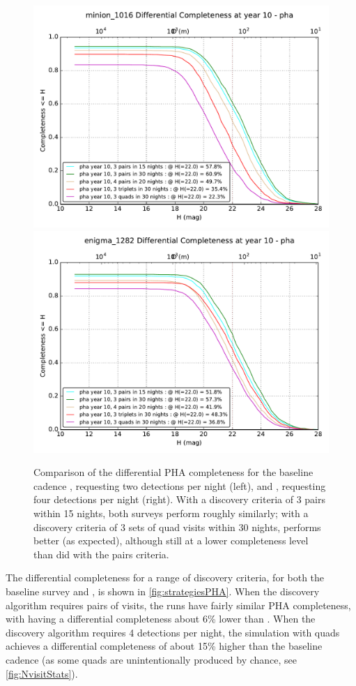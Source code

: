 \begin{figure}[bh]
\includegraphics[angle=0,width=0.49\hsize:,clip]{figs/solarsystem/minion_1016_Completeness_3_15_pairs_3_30_pairs_quads_3_30_3_30_triplets_pairs_20_4_nights_in_pha_year_10_MOOB_ComboMetricVsH}
\includegraphics[angle=0,width=0.49\hsize:,clip]{figs/solarsystem/enigma_1282_Completeness_3_15_pairs_3_30_pairs_quads_3_30_3_30_triplets_pairs_20_4_nights_in_pha_year_10_MOOB_ComboMetricVsH}
\caption{%
Comparison of the differential PHA completeness for the baseline cadence
, requesting two detections per night (left), and 
, requesting four detections per
night (right). With a discovery criteria of 3 pairs within 15 nights,
both surveys perform roughly similarly; with a discovery criteria of 3
sets of quad visits within 30 nights,
 performs better (as expected),
although still at a lower completeness level than
 did with the pairs criteria.}
\label{fig:strategiesPHA}
\end{figure}
 
The differential completeness for a range of discovery criteria, for
both the baseline survey and , is
shown in \autoref{fig:strategiesPHA}. When the discovery algorithm
requires pairs of visits, the runs have fairly similar PHA
completeness, with  having a
differential completeness about 6\% lower than
.  When the discovery algorithm requires 4
detections per night, the simulation with quads achieves a
differential completeness of about 15\% higher than the baseline
cadence (as some quads are unintentionally produced by chance, see
\autoref{fig:NvisitStats}).

